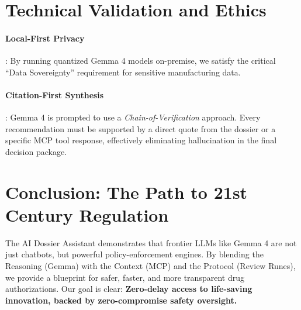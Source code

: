 \documentclass[11pt,a4paper]{article}
\begin{document}
\section{Technical Validation and Ethics}
\paragraph{Local-First Privacy}: By running quantized Gemma 4 models on-premise, we satisfy the critical ``Data Sovereignty'' requirement for sensitive manufacturing data.
\paragraph{Citation-First Synthesis}: Gemma 4 is prompted to use a \textit{Chain-of-Verification} approach. Every recommendation must be supported by a direct quote from the dossier or a specific MCP tool response, effectively eliminating hallucination in the final decision package.

\section{Conclusion: The Path to 21st Century Regulation}
The AI Dossier Assistant demonstrates that frontier LLMs like Gemma 4 are not just chatbots, but powerful policy-enforcement engines. By blending the Reasoning (Gemma) with the Context (MCP) and the Protocol (Review Runes), we provide a blueprint for safer, faster, and more transparent drug authorizations. Our goal is clear: \textbf{Zero-delay access to life-saving innovation, backed by zero-compromise safety oversight.}
\end{document}
